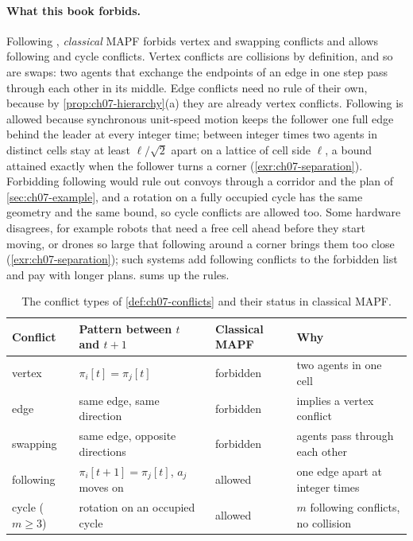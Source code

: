 \paragraph{What this book forbids.}
Following \textcite{stern2019mapf}, \emph{classical} MAPF forbids vertex and
swapping conflicts and allows following and cycle conflicts. Vertex
conflicts are collisions by definition, and so are swaps: two agents that
exchange the endpoints of an edge in one step pass through each other in its
middle. Edge conflicts need no rule of their own, because by
\cref{prop:ch07-hierarchy}(a) they are already vertex conflicts. Following
is allowed because synchronous unit-speed motion keeps the follower one full
edge behind the leader at every integer time; between integer times two
agents in distinct cells stay at least $\ell/\sqrt{2}$ apart on a lattice of
cell side $\ell$, a bound attained exactly when the follower turns a corner
(\cref{exr:ch07-separation}). Forbidding following would rule out convoys
through a corridor and the plan of \cref{sec:ch07-example}, and a rotation
on a fully occupied cycle has the same geometry and the same bound, so cycle
conflicts are allowed too. Some hardware disagrees, for example robots that
need a free cell ahead before they start moving, or drones so large that
following around a corner brings them too close
(\cref{exr:ch07-separation}); such systems add following conflicts to the
forbidden list and pay with longer plans. 
sums up the rules.

\begin{table}[!htb]
  \centering\small
  \caption{The conflict types of \cref{def:ch07-conflicts} and their status in classical MAPF.}
  \label{tab:ch07-conflict-summary}
  \begin{tabular}{@{}llll@{}}
  \toprule
  Conflict & Pattern between $t$ and $t+1$ & Classical MAPF & Why\\
  \midrule
  vertex & $\pi_i[t] = \pi_j[t]$ & forbidden & two agents in one cell\\
  edge & same edge, same direction & forbidden & implies a vertex conflict\\
  swapping & same edge, opposite directions & forbidden & agents pass through each other\\
  following & $\pi_i[t+1] = \pi_j[t]$, $a_j$ moves on & allowed & one edge apart at integer times\\
  cycle ($m \ge 3$) & rotation on an occupied cycle & allowed & $m$ following conflicts, no collision\\
  \bottomrule
  \end{tabular}
\end{table}

